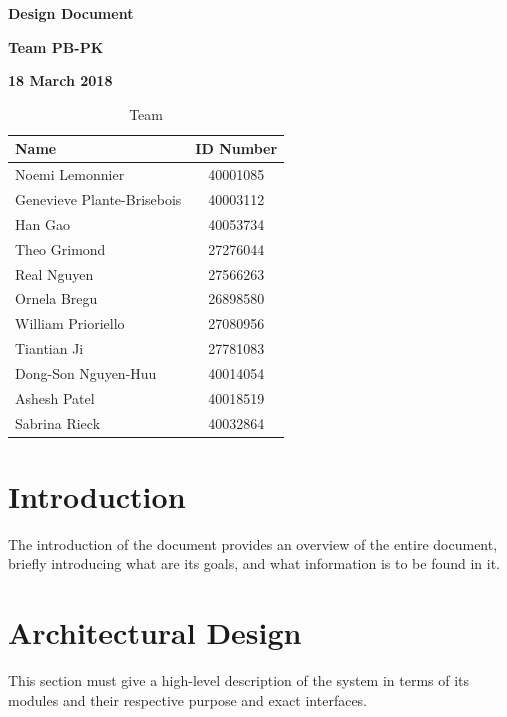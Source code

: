 \documentclass[12pt]{article}
\begin{document}
\vspace*{0.5in}
\centerline{\bf\Large Design Document}

\vspace*{0.5in}
\centerline{\bf\Large Team PB-PK}

\vspace*{0.5in}
\centerline{\bf\Large 18 March 2018}

\vspace*{1.5in}
\begin{table}[htbp]
\begin{center}
\begin{tabular}{|l | c|}
\hline
Name & ID Number \\
\hline\hline
Noemi Lemonnier & 40001085 \\ \hline 
Genevieve Plante-Brisebois & 40003112 \\ \hline 
Han Gao & 40053734 \\ \hline 
Theo Grimond & 27276044 \\ \hline 
Real Nguyen & 27566263 \\ \hline 
Ornela Bregu & 26898580 \\ \hline 
William Prioriello & 27080956 \\ \hline 
Tiantian Ji & 27781083 \\ \hline 
Dong-Son Nguyen-Huu & 40014054  \\ \hline 
Ashesh Patel & 40018519 \\ \hline 
Sabrina Rieck & 40032864 \\ \hline
\hline
\end{tabular}
\end{center}
\caption{Team}
\end{table}

\clearpage

\section{Introduction}

The introduction of the document provides an overview of the entire document,
briefly introducing what are its goals, and what information is to be found in it.

\section{Architectural Design} \label{sec:arch}

This section must give a high-level description of the system in terms of its modules
and their respective purpose and exact interfaces.
\end{document}
